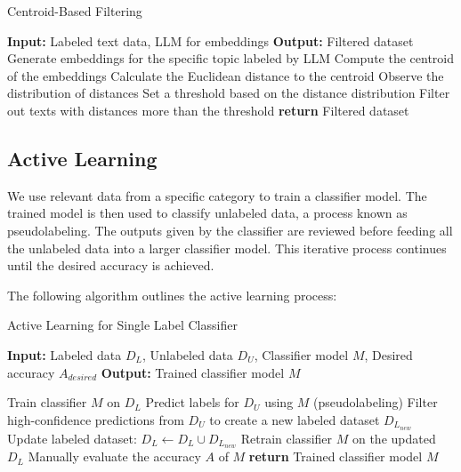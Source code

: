 \documentclass[preprint]{article}
\begin{document}
\begin{algorithm}[H]
  \caption{Centroid-Based Filtering}
  \label{alg:centroid_filtering}
  \begin{algorithmic}[1]
  \State \textbf{Input:} Labeled text data, LLM for embeddings
  \State \textbf{Output:} Filtered dataset
  \State Generate embeddings for the specific topic labeled by LLM
  \State Compute the centroid of the embeddings
      \State Calculate the Euclidean distance to the centroid
  \State Observe the distribution of distances
  \State Set a threshold based on the distance distribution
  \State Filter out texts with distances more than the threshold
  \State \textbf{return} Filtered dataset
  \end{algorithmic}
  \end{algorithm}


\subsection{Active Learning}

We use relevant data from a specific category to train a classifier model. The trained model is then used to classify unlabeled data, a process known as pseudolabeling. The outputs given by the classifier are reviewed before feeding all the unlabeled data into a larger classifier model. This iterative process continues until the desired accuracy is achieved.

The following algorithm outlines the active learning process:

\begin{algorithm}[H]
  \caption{Active Learning for Single Label Classifier}
  \begin{algorithmic}[1]
  \State \textbf{Input:} Labeled data \(D_L\), Unlabeled data \(D_U\), Classifier model \(M\), Desired accuracy \(A_{desired}\)
  \State \textbf{Output:} Trained classifier model \(M\)
  
      \State Train classifier \(M\) on \(D_L\)
      \State Predict labels for \(D_U\) using \(M\) (pseudolabeling)
      \State Filter high-confidence predictions from \(D_U\) to create a new labeled dataset \(D_{L_{new}}\)
      \State Update labeled dataset: \(D_L \leftarrow D_L \cup D_{L_{new}}\)
      \State Retrain classifier \(M\) on the updated \(D_L\)
      \State Manually evaluate the accuracy \(A\) of \(M\)
  \State \textbf{return} Trained classifier model \(M\)
  \end{algorithmic}
  \end{algorithm}
\end{document}
